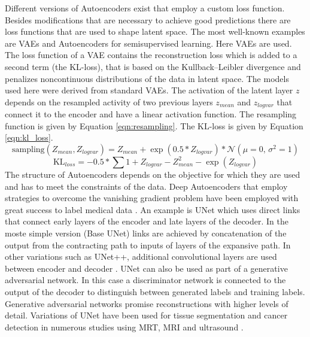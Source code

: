 Different versions of Autoencoders exist that employ a custom loss function. Besides modifications that are necessary to achieve good predictions there are loss functions that are used to shape latent space. The most well-known examples are VAEs and Autoencoders for semisupervised learning. Here VAEs are used. The loss function of a VAE contains the reconstruction loss which is added to a second term (the KL-loss), that is based on the Kullback–Leibler divergence and penalizes noncontinuous distributions of the data in latent space. The models used here were derived from standard VAEs. The activation of the latent layer $z$ depends on the resampled activity of two previous layers $z_{mean}$ and $z_{logvar}$ that connect it to the encoder and have a linear activation function. The resampling function is given by Equation \ref{eqn:resampling}. The KL-loss is given by Equation \ref{eqn:kl_loss}.\\
\begin{equation}
\text{sampling}(Z_{mean}, Z_{log var}) = Z_{mean}+ \exp(0.5 * Z_{log var}) * \mathcal{N}(\mu = 0,\,\sigma^{2}=1)
\label{eqn:resampling}
\end{equation}
\begin{equation}
  \text{KL}_{loss} = -0.5 * \sum 1 + Z_{log var} - Z_{mean}^2 - \exp(Z_{log var})
\label{eqn:kl_loss}
\end{equation}
The structure of Autoencoders depends on the objective for which they are used and has to meet the constraints of the data. Deep Autoencoders that employ strategies to overcome the vanishing gradient problem have been employed with great success to label medical data \parencite{du2020medical}. An example is UNet which uses direct links that connect early layers of the encoder and late layers of the decoder. In the moste simple version (Base UNet) links are achieved by concatenation of the output from the contracting path to inputs of layers of the expansive path. In other variations such as UNet++, additional convolutional layers are used between encoder and decoder \parencite{du2020medical}. UNet can also be used as part of a generative adversarial network. In this case a discriminator network is connected to the output of the decoder to distinguish between generated labels and training labels. Generative adversarial networks promise reconstructions with higher levels of detail. Variations of UNet have been used for tissue segmentation and cancer detection in numerous studies using MRT, MRI and ultrasound \parencite{du2020medical}. \\
